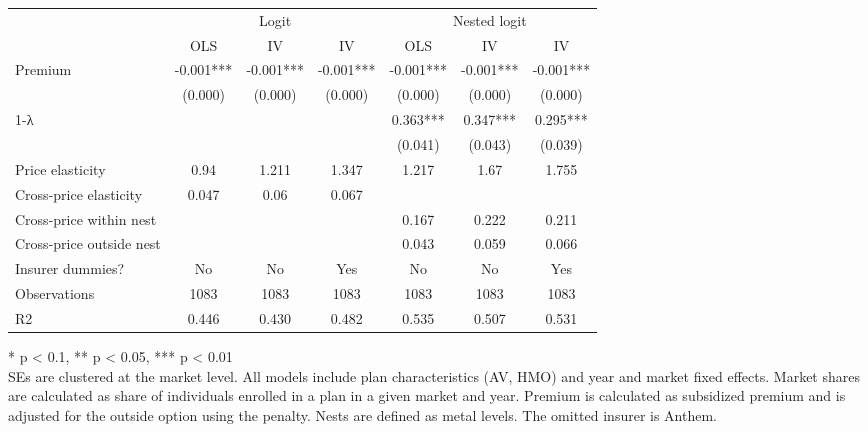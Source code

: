 \setlength{\LTpost}{0mm}
\begin{longtable}{lcccccc}
\toprule
 & \multicolumn{3}{c}{Logit} & \multicolumn{3}{c}{Nested logit} \\ 
\cmidrule(lr){2-4} \cmidrule(lr){5-7}
  & OLS & IV & IV & OLS & IV & IV \\ 
\midrule\addlinespace[2.5pt]
Premium & -0.001*** & -0.001*** & -0.001*** & -0.001*** & -0.001*** & -0.001*** \\ 
 & (0.000) & (0.000) & (0.000) & (0.000) & (0.000) & (0.000) \\ 
1-λ &  &  &  & 0.363*** & 0.347*** & 0.295*** \\ 
 &  &  &  & (0.041) & (0.043) & (0.039) \\ 
Price elasticity & 0.94 & 1.211 & 1.347 & 1.217 & 1.67 & 1.755 \\ 
Cross-price elasticity & 0.047 & 0.06 & 0.067 &  &  &  \\ 
Cross-price within nest &  &  &  & 0.167 & 0.222 & 0.211 \\ 
Cross-price outside nest &  &  &  & 0.043 & 0.059 & 0.066 \\ 
Insurer dummies? & No & No & Yes & No & No & Yes \\ 
Observations & 1083 & 1083 & 1083 & 1083 & 1083 & 1083 \\ 
R2 & 0.446 & 0.430 & 0.482 & 0.535 & 0.507 & 0.531 \\ 
\bottomrule
\end{longtable}
\begin{minipage}{\linewidth}
* p < 0.1, ** p < 0.05, *** p < 0.01\\
SEs are clustered at the market level. All models include plan characteristics (AV, HMO) and year and market fixed effects. 
                   Market shares are calculated as share of individuals enrolled in a plan in a given market and year. 
                   Premium is calculated as subsidized premium and is adjusted for the outside option using the penalty. 
                   Nests are defined as metal levels. The omitted insurer is Anthem.\\
\end{minipage}

